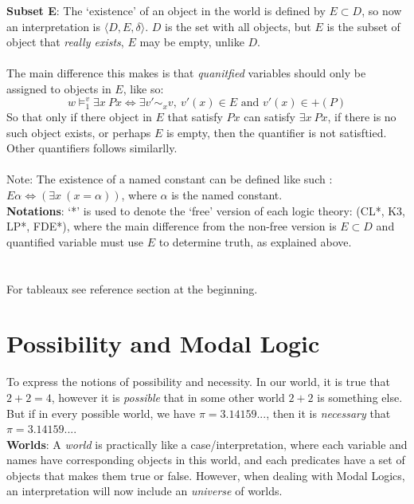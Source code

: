 \documentclass{article}
\begin{document}
\noindent \textbf{Subset E}: The `existence' of an object in the world is defined by $E \subset D$, so
now an interpretation is $\langle D, E, \delta \rangle$. $D$ is the set with all objects, 
but $E$ is the subset of object that \emph{really exists}, $E$ may be empty, unlike $D$.\\\\
\noindent The main difference this makes is that \emph{quanitfied} variables should only be assigned to 
objects in $E$, like so: 
$$
w\models_1^v \exists x \ Px \iff \exists v' \mathtt{\sim}_x v, \ v'(x) \in E \text{ and } v'(x) \in +(P)
$$
So that only if there object in $E$ that satisfy $Px$ can satisfy $\exists x \ Px$, if there is no such object 
exists, or perhaps $E$ is empty, then the quantifier is not satisftied. Other quantifiers follows similarlly.\\
\\
Note: The existence of a named constant can be defined like such : $E\alpha \iff (\exists x\ (x = \alpha))$, where $\alpha$ is the 
named constant.\\

\noindent \textbf{Notations}: `*' is used to denote the `free' version of each logic theory: (CL*, K3, LP*, FDE*), 
where the main difference from the non-free version is $E \subset D$ and quantified variable must use $E$ to determine truth, as explained above.\\\\\\

For tableaux see reference section at the beginning.

\newpage
\section{Possibility and Modal Logic}
\large
To express the notions of possibility and necessity. In our world, it is true that $2 + 2 = 4$, however 
it is \emph{possible} that in some other world $2 + 2$ is something else. But if in every possible world, 
we have $\pi = 3.14159...$, then it is \emph{necessary} that $\pi = 3.14159...$.\\

\noindent \textbf{Worlds}: A \emph{world} is practically like a case/interpretation, where each variable and names
have corresponding objects in this world, and each predicates have a set of objects that makes them true or false. 
However, when dealing with Modal Logics, an interpretation will now include an \emph{universe} of worlds.\\
\end{document}
